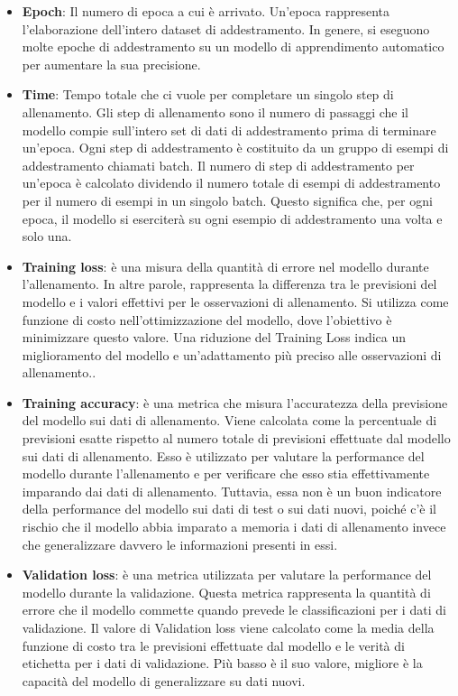 \documentclass[a4paper,final,12pt]{report}
\begin{document}
\begin{itemize}
    \item \textbf{Epoch}: Il numero di epoca a cui è arrivato. Un'epoca rappresenta l'elaborazione dell'intero dataset di addestramento. In genere, si eseguono molte epoche di addestramento su un modello di apprendimento automatico per aumentare la sua precisione.
    \item \textbf{Time}: Tempo totale che ci vuole per completare un singolo step di allenamento. Gli step di allenamento sono il numero di passaggi che il modello compie sull'intero set di dati di addestramento prima di terminare un'epoca. Ogni step di addestramento è costituito da un gruppo di esempi di addestramento chiamati batch. Il numero di step di addestramento per un'epoca è calcolato dividendo il numero totale di esempi di addestramento per il numero di esempi in un singolo batch. Questo significa che, per ogni epoca, il modello si eserciterà su ogni esempio di addestramento una volta e solo una.
    \item \textbf{Training loss}: è una misura della quantità di errore nel modello durante l'allenamento. In altre parole, rappresenta la differenza tra le previsioni del modello e i valori effettivi per le osservazioni di allenamento. Si utilizza come funzione di costo nell'ottimizzazione del modello, dove l'obiettivo è minimizzare questo valore. Una riduzione del Training Loss indica un miglioramento del modello e un'adattamento più preciso alle osservazioni di allenamento..
    \item \textbf{Training accuracy}: è una metrica che misura l'accuratezza della previsione del modello sui dati di allenamento. Viene calcolata come la percentuale di previsioni esatte rispetto al numero totale di previsioni effettuate dal modello sui dati di allenamento. Esso è utilizzato per valutare la performance del modello durante l'allenamento e per verificare che esso stia effettivamente imparando dai dati di allenamento. Tuttavia, essa non è un buon indicatore della performance del modello sui dati di test o sui dati nuovi, poiché c'è il rischio che il modello abbia imparato a memoria i dati di allenamento invece che generalizzare davvero le informazioni presenti in essi.
    \item \textbf{Validation loss}: è una metrica utilizzata per valutare la performance del modello durante la validazione. Questa metrica rappresenta la quantità di errore che il modello commette quando prevede le classificazioni per i dati di validazione. Il valore di Validation loss viene calcolato come la media della funzione di costo tra le previsioni effettuate dal modello e le verità di etichetta per i dati di validazione. Più basso è il suo valore, migliore è la capacità del modello di generalizzare su dati nuovi.

\end{itemize}
\end{document}
